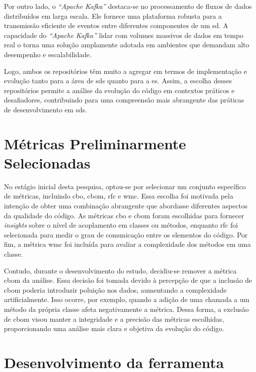 Por outro lado, o \textit{``Apache Kafka''} destaca-se no processamento de fluxos de dados distribuídos em larga escala. Ele fornece uma plataforma robusta para a transmissão eficiente de eventos entre diferentes componentes de um \gls{sd}. A capacidade do \textit{``Apache Kafka''} lidar com volumes massivos de dados em tempo real o torna uma solução amplamente adotada em ambientes que demandam alto desempenho e escalabilidade.

Logo, ambos os repositórios têm muito a agregar em termos de implementação e evolução tanto para a área de \gls{sds} quanto para a \gls{es}. Assim, a escolha desses repositórios permite a análise da evolução do código em contextos práticos e desafiadores, contribuindo para uma compreensão mais abrangente das práticas de desenvolvimento em \gls{sds}.

\section{Métricas Preliminarmente Selecionadas}

No estágio inicial desta pesquisa, optou-se por selecionar um conjunto específico de métricas, incluindo \gls{cbo}, \gls{cbom}, \gls{rfc} e \gls{wmc}. Essa escolha foi motivada pela intenção de obter uma combinação abrangente que abordasse diferentes aspectos da qualidade do código. As métricas \gls{cbo} e \gls{cbom} foram escolhidas para fornecer \textit{insights} sobre o nível de acoplamento em classes ou métodos, enquanto \gls{rfc} foi selecionada para medir o grau de comunicação entre os elementos do código. Por fim, a métrica \gls{wmc} foi incluída para avaliar a complexidade dos métodos em uma classe.

Contudo, durante o desenvolvimento do estudo, decidiu-se remover a métrica \gls{cbom} da análise. Essa decisão foi tomada devido à percepção de que a inclusão de \gls{cbom} poderia introduzir poluição nos dados, aumentando a complexidade artificialmente. Isso ocorre, por exemplo, quando a adição de uma chamada a um método da própria classe afeta negativamente a métrica. Dessa forma, a exclusão de \gls{cbom} visou manter a integridade e a precisão das métricas escolhidas, proporcionando uma análise mais clara e objetiva da evolução do código.

\section{Desenvolvimento da ferramenta}

